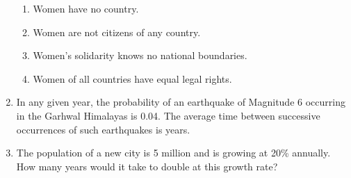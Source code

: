 \documentclass[journal,12pt,onecolumn]{IEEEtran}
\theoremstyle{remark}
\begin{document}
\begin{enumerate}
    \hfill{}
    \begin{enumerate}
        \item Women have no country.
        \item Women are not citizens of any country.
        \item Women's solidarity knows no national boundaries.
        \item Women of all countries have equal legal rights.
    \end{enumerate}

    \item In any given year, the probability of an earthquake of Magnitude 6 occurring in the Garhwal Himalayas is 0.04. The average time between successive occurrences of such earthquakes is \underline{\hspace{2cm}} years.

    \hfill{}

    
    
    \item The population of a new city is 5 million and is growing at 20\% annually. How many years would it take to double at this growth rate?

    \hfill{}
        \begin{enumerate}
        \end{enumerate}

\end{enumerate}
\end{document}
